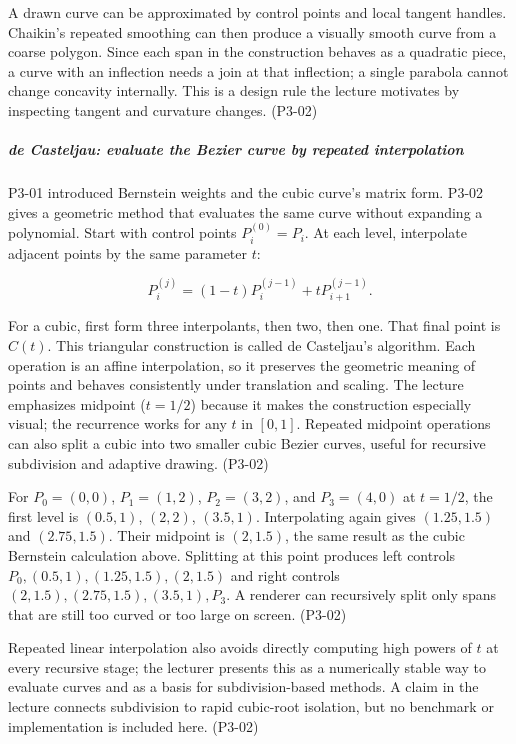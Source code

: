 A drawn curve can be approximated by control points and local tangent handles. Chaikin's repeated smoothing can then produce a visually smooth curve from a coarse polygon. Since each span in the construction behaves as a quadratic piece, a curve with an inflection needs a join at that inflection; a single parabola cannot change concavity internally. This is a design rule the lecture motivates by inspecting tangent and curvature changes. (P3-02)

\subparagraph{de Casteljau: evaluate the Bezier curve by repeated interpolation}\label{03-visual-computing-i-ch001-de-casteljau-evaluate-the-bezier-curve-by-repeated-interpolation}

\hypertarget{03-visual-computing-i-ch001-de-casteljau-evaluate-the-bezier-curve-by-repeated-interpolation}{}

P3-01 introduced Bernstein weights and the cubic curve's matrix form. P3-02 gives a geometric method that evaluates the same curve without expanding a polynomial. Start with control points \(P_i^{(0)}=P_i\). At each level, interpolate adjacent points by the same parameter \(t\):

\[
P_i^{(j)}=(1-t)P_i^{(j-1)}+tP_{i+1}^{(j-1)}.
\]

For a cubic, first form three interpolants, then two, then one. That final point is \(C(t)\). This triangular construction is called de Casteljau's algorithm. Each operation is an affine interpolation, so it preserves the geometric meaning of points and behaves consistently under translation and scaling. The lecture emphasizes midpoint (\(t=1/2\)) because it makes the construction especially visual; the recurrence works for any \(t\) in \([0,1]\). Repeated midpoint operations can also split a cubic into two smaller cubic Bezier curves, useful for recursive subdivision and adaptive drawing. (P3-02)

For \(P_0=(0,0)\), \(P_1=(1,2)\), \(P_2=(3,2)\), and \(P_3=(4,0)\) at \(t=1/2\), the first level is \((0.5,1)\), \((2,2)\), \((3.5,1)\). Interpolating again gives \((1.25,1.5)\) and \((2.75,1.5)\). Their midpoint is \((2,1.5)\), the same result as the cubic Bernstein calculation above. Splitting at this point produces left controls \(P_0,(0.5,1),(1.25,1.5),(2,1.5)\) and right controls \((2,1.5),(2.75,1.5),(3.5,1),P_3\). A renderer can recursively split only spans that are still too curved or too large on screen. (P3-02)

Repeated linear interpolation also avoids directly computing high powers of \(t\) at every recursive stage; the lecturer presents this as a numerically stable way to evaluate curves and as a basis for subdivision-based methods. A claim in the lecture connects subdivision to rapid cubic-root isolation, but no benchmark or implementation is included here. (P3-02)

